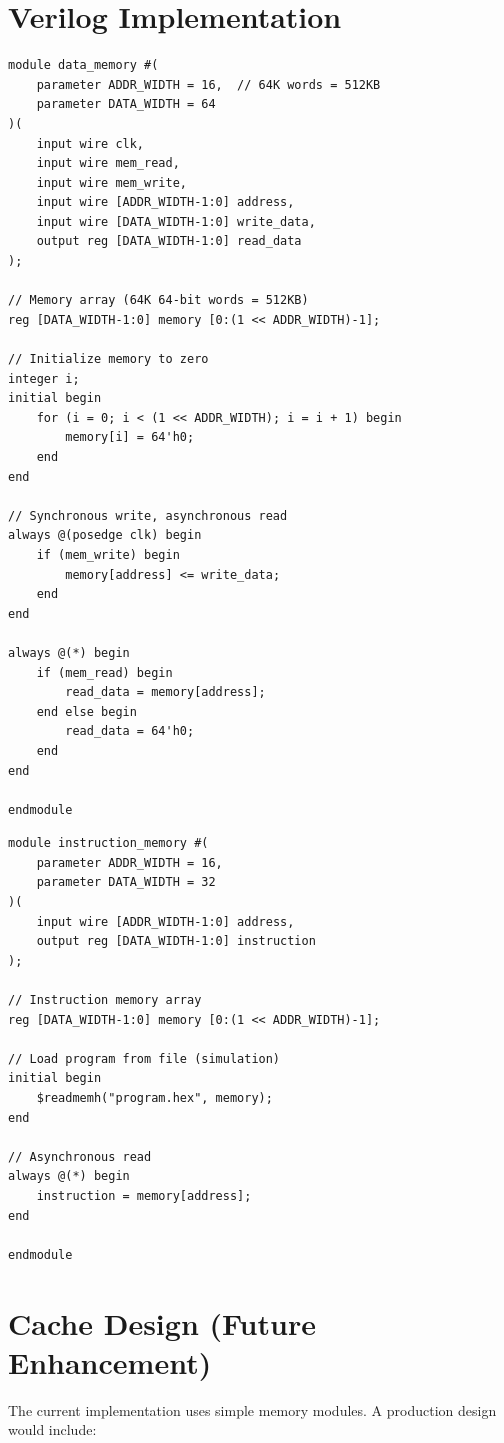 \documentclass[12pt,a4paper,oneside]{book}
\begin{document}
\section{Verilog Implementation}

\begin{lstlisting}[style=verilog, caption={Data Memory Module}, label={lst:data-mem}]
module data_memory #(
    parameter ADDR_WIDTH = 16,  // 64K words = 512KB
    parameter DATA_WIDTH = 64
)(
    input wire clk,
    input wire mem_read,
    input wire mem_write,
    input wire [ADDR_WIDTH-1:0] address,
    input wire [DATA_WIDTH-1:0] write_data,
    output reg [DATA_WIDTH-1:0] read_data
);

// Memory array (64K 64-bit words = 512KB)
reg [DATA_WIDTH-1:0] memory [0:(1 << ADDR_WIDTH)-1];

// Initialize memory to zero
integer i;
initial begin
    for (i = 0; i < (1 << ADDR_WIDTH); i = i + 1) begin
        memory[i] = 64'h0;
    end
end

// Synchronous write, asynchronous read
always @(posedge clk) begin
    if (mem_write) begin
        memory[address] <= write_data;
    end
end

always @(*) begin
    if (mem_read) begin
        read_data = memory[address];
    end else begin
        read_data = 64'h0;
    end
end

endmodule
\end{lstlisting}

\begin{lstlisting}[style=verilog, caption={Instruction Memory Module}, label={lst:inst-mem}]
module instruction_memory #(
    parameter ADDR_WIDTH = 16,
    parameter DATA_WIDTH = 32
)(
    input wire [ADDR_WIDTH-1:0] address,
    output reg [DATA_WIDTH-1:0] instruction
);

// Instruction memory array
reg [DATA_WIDTH-1:0] memory [0:(1 << ADDR_WIDTH)-1];

// Load program from file (simulation)
initial begin
    $readmemh("program.hex", memory);
end

// Asynchronous read
always @(*) begin
    instruction = memory[address];
end

endmodule
\end{lstlisting}

\section{Cache Design (Future Enhancement)}

The current implementation uses simple memory modules. A production design would include:
\end{document}
